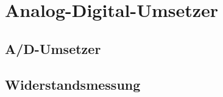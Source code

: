 \section{Analog-Digital-Umsetzer}
\subsection{A/D-Umsetzer}
\subsubsection{}


\subsubsection{}



\subsection{Widerstandsmessung}

